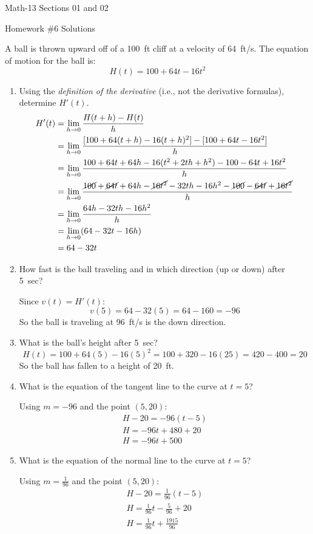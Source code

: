 \documentclass[letterpaper,12pt,fleqn]{article}
\begin{document}
\begin{center}
  \large
  Math-13 Sections 01 and 02

  \Large
  Homework \#6 Solutions
\end{center}

A ball is thrown upward off of a \SI{100}{ft} cliff at a velocity of \SI{64}{ft/s}.  The equation of motion for the
ball is:
\[H(t)=100+64t-16t^2\]
\begin{enumerate}[left=0in]
\item Using the \emph{definition of the derivative} (i.e., not the derivative formulas), determine \(H'(t)\).
  \begin{align*}
    H'(t) &= \lim_{h\to0}\frac{H(t+h)-H(t)}{h} \\
    &= \lim_{h\to0}\frac{[100+64(t+h)-16(t+h)^2]-[100+64t-16t^2]}{h} \\
    &= \lim_{h\to0}\frac{100+64t+64h-16(t^2+2th+h^2)-100-64t+16t^2}{h} \\
    &= \lim_{h\to0}\frac{\cancel{100}+\cancel{64t}+64h-\cancel{16t^2}-32th-16h^2-\cancel{100}-
      \cancel{64t}+\cancel{16t^2}}{h} \\
    &= \lim_{h\to0}\frac{64h-32th-16h^2}{h} \\
    &= \lim_{h\to0}(64-32t-16h) \\
    &= 64-32t
  \end{align*}
\item How fast is the ball traveling and in which direction (up or down) after \SI{5}{sec}?

  Since \(v(t)=H'(t)\):
  \[v(5)=64-32(5)=64-160=-96\]
  So the ball is traveling at \SI{96}{ft/s} is the down direction.
\item What is the ball's height after \SI{5}{sec}?
  \[H(t)=100+64(5)-16(5)^2=100+320-16(25)=420-400=20\]
  So the ball has fallen to a height of \SI{20}{ft}.
\item What is the equation of the tangent line to the curve at \(t=5\)?

  Using \(m=-96\) and the point \((5,20)\):
  \begin{gather*}
    H-20=-96(t-5) \\
    H=-96t+480+20 \\
    H=-96t+500
  \end{gather*}
\item What is the equation of the normal line to the curve at \(t=5\)?

  Using \(m=\frac{1}{96}\) and the point \((5,20)\):
  \begin{gather*}
    H-20=\frac{1}{96}(t-5) \\
    H=\frac{1}{96}t-\frac{5}{96}+20 \\
    H=\frac{1}{96}t+\frac{1915}{96}
  \end{gather*}
\end{enumerate}
\end{document}
